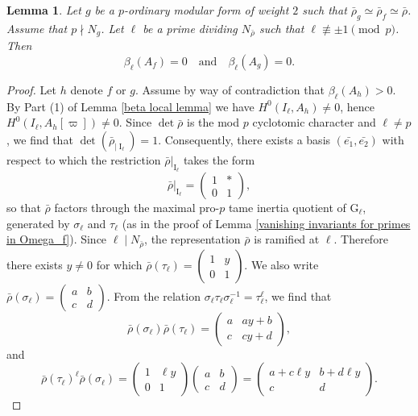 \documentclass[table]{amsart}
\newtheorem{lemma}[theorem]{Lemma}
\newcommand{\op}[1]{\operatorname{#1}}
\numberwithin{equation}{section}
\begin{document}
\begin{lemma}\label{lemma for primes dividing artin cond}
Let $g$ be a $p$-ordinary modular form of weight $2$ such that $\bar{\rho}_g \simeq \bar{\rho}_f \simeq \bar{\rho}$. Assume that $p\nmid N_g$. Let $\ell$ be a prime dividing $N_{\bar{\rho}}$ such that $\ell \not\equiv \pm 1 \pmod{p}$.
Then
\[
\beta_\ell(A_f) = 0 \quad \text{and} \quad \beta_\ell(A_g) = 0.
\]
\end{lemma}

\begin{proof}
Let $h$ denote $f$ or $g$. Assume by way of contradiction that $\beta_\ell(A_h)>0$. By Part (1) of Lemma \ref{beta local lemma} we have $H^{0}\left(I_{\ell}, A_{h}\right) \neq 0$, hence $H^{0}\left(I_{\ell}, A_{h}[\varpi]\right) \neq 0$. Since $\det\bar{\rho}$ is the mod $p$ cyclotomic character and $\ell\neq p$, we find that $\op{det}(\bar{\rho}_{|\op{I}_\ell})=1$. Consequently, there exists a basis $(\bar{e_1}, \bar{e_2})$ with respect to which the restriction $\bar{\rho}|_{\mathrm{I}_\ell}$ takes the form
\[
\bar{\rho}|_{\mathrm{I}_\ell} = \begin{pmatrix} 1 & * \\ 0 & 1 \end{pmatrix},
\]
so that $\bar{\rho}$ factors through the maximal pro-$p$ tame inertia quotient of $\mathrm{G}_\ell$, generated by $\sigma_\ell$ and $\tau_\ell$ (as in the proof of Lemma \ref{vanishing invariants for primes in Omega_f}).
Since $\ell \mid N_{\bar{\rho}}$, the representation $\bar{\rho}$ is ramified at $\ell$. Therefore there exists $y\neq 0$ for which $\bar{\rho}(\tau_\ell) = \begin{pmatrix} 1 & y \\ 0 & 1 \end{pmatrix}.$ We also write $\bar{\rho}(\sigma_\ell) = \begin{pmatrix} a & b \\ c & d \end{pmatrix}$. From the relation $\sigma_\ell \tau_\ell \sigma_\ell^{-1}=\tau_\ell^\ell$, we find that
\[
\bar{\rho}(\sigma_\ell) \bar{\rho}(\tau_\ell) = \begin{pmatrix} a & ay + b \\ c & cy + d \end{pmatrix},
\]
and
\[
\bar{\rho}(\tau_\ell)^\ell \bar{\rho}(\sigma_\ell) = \begin{pmatrix} 1 & \ell y \\ 0 & 1 \end{pmatrix} \begin{pmatrix} a & b \\ c & d \end{pmatrix} = \begin{pmatrix} a + c \ell y & b + d \ell y \\ c & d \end{pmatrix}.
\]
\end{proof}
\end{document}
